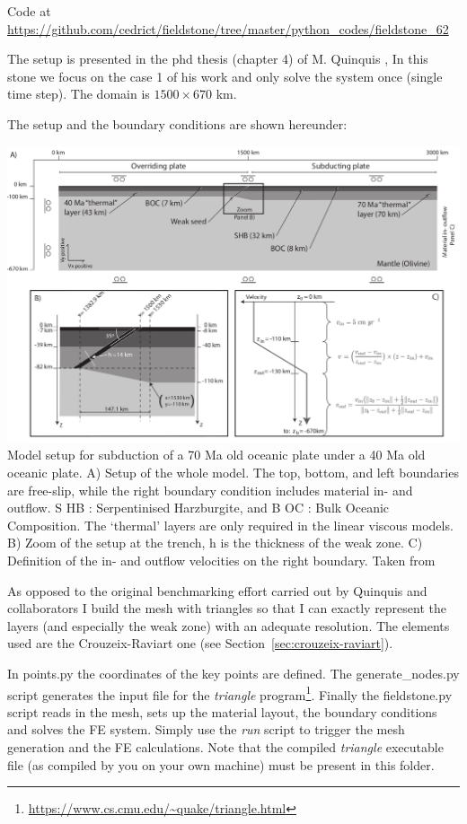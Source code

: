 
Code at \url{https://github.com/cedrict/fieldstone/tree/master/python_codes/fieldstone_62}

The setup is presented in the phd thesis (chapter 4) of M. Quinquis \cite{quin14},
In this stone we focus on the case 1 of his work and only solve the system once (single time step).
The domain is $1500\times 670$ km. 

The setup and the boundary conditions are shown hereunder:
\begin{center}
\includegraphics[width=\linewidth]{python_codes/fieldstone_62/images/quin14_setup}\\
{\captionfont Model setup for subduction of a 70 Ma old oceanic plate under a 40 Ma
old oceanic plate. A) Setup of the whole model. The top, bottom, and left boundaries
are free-slip, while the right boundary condition includes material in- and outflow. S HB :
Serpentinised Harzburgite, and B OC : Bulk Oceanic Composition. The ‘thermal’ layers
are only required in the linear viscous models. B) Zoom of the setup at the trench, h is the
thickness of the weak zone. C) Definition of the in- and outflow velocities on the right
boundary. Taken from \cite{quin14}}
\end{center}

As opposed to the original benchmarking effort carried out by Quinquis and collaborators
I build the mesh with triangles so that I can exactly represent the layers (and especially 
the weak zone) with an adequate resolution. The elements used are the Crouzeix-Raviart one
(see Section~\ref{sec:crouzeix-raviart}). 

In {points.py} the coordinates of the key points are defined. The {generate\_nodes.py}
script generates the input file for 
the {\sl triangle} program\footnote{\url{https://www.cs.cmu.edu/~quake/triangle.html}}. 
Finally the {fieldstone.py} script 
reads in the mesh, sets up the material layout, the boundary conditions and solves the 
FE system. Simply use the {\sl run} script to trigger the mesh generation and the FE 
calculations.  
Note that the compiled {\sl triangle} executable file (as compiled by you 
on your own machine) must be present in this folder.


